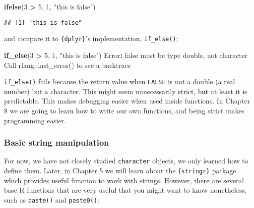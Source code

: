 \documentclass[
]{article}
\newenvironment{Shaded}{\begin{snugshade}}{\end{snugshade}}
\newcommand{\DataTypeTok}[1]{\textcolor[rgb]{0.13,0.29,0.53}{#1}}
\newcommand{\DecValTok}[1]{\textcolor[rgb]{0.00,0.00,0.81}{#1}}
\newcommand{\KeywordTok}[1]{\textcolor[rgb]{0.13,0.29,0.53}{\textbf{#1}}}
\newcommand{\NormalTok}[1]{#1}
\newcommand{\OperatorTok}[1]{\textcolor[rgb]{0.81,0.36,0.00}{\textbf{#1}}}
\newcommand{\StringTok}[1]{\textcolor[rgb]{0.31,0.60,0.02}{#1}}
\begin{document}
\begin{Shaded}
\begin{Highlighting}[]
\KeywordTok{ifelse}\NormalTok{(}\DecValTok{3} \OperatorTok{\textgreater{}}\StringTok{ }\DecValTok{5}\NormalTok{, }\DecValTok{1}\NormalTok{, }\StringTok{"this is false"}\NormalTok{)}
\end{Highlighting}
\end{Shaded}

\begin{verbatim}
## [1] "this is false"
\end{verbatim}

and compare it to \texttt{\{dplyr\}}'s implementation, \texttt{if\_else()}:

\begin{Shaded}
\begin{Highlighting}[]
\KeywordTok{if\_else}\NormalTok{(}\DecValTok{3} \OperatorTok{\textgreater{}}\StringTok{ }\DecValTok{5}\NormalTok{, }\DecValTok{1}\NormalTok{, }\StringTok{"this is false"}\NormalTok{)}
\NormalTok{Error}\OperatorTok{:}\StringTok{ \textasciigrave{}}\DataTypeTok{false}\StringTok{\textasciigrave{}}\NormalTok{ must be type double, not character}
\NormalTok{Call }\StringTok{\textasciigrave{}}\DataTypeTok{rlang::last\_error()}\StringTok{\textasciigrave{}}\NormalTok{ to see a backtrace}
\end{Highlighting}
\end{Shaded}

\texttt{if\_else()} fails because the return value when \texttt{FALSE} is not a double (a real number) but a character. This might seem unnecessarily
strict, but at least it is predictable. This makes debugging easier when used inside functions. In Chapter 8 we are going to learn how
to write our own functions, and being strict makes programming easier.

\hypertarget{basic-string-manipulation}{%
\subsubsection{Basic string manipulation}\label{basic-string-manipulation}}

For now, we have not closely studied \texttt{character} objects, we only learned how to define them. Later, in Chapter 5 we will learn about the
\texttt{\{stringr\}} package which provides useful function to work with strings. However, there are several base R functions that are very
useful that you might want to know nonetheless, such as \texttt{paste()} and \texttt{paste0()}:
\end{document}
